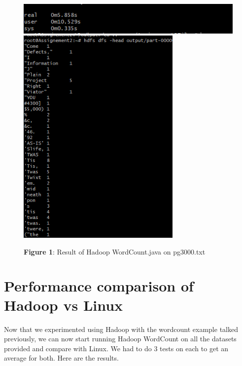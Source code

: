\documentclass[12pt]{article}
\begin{document}
	\begin{figure}[H]
	\centering
	\includegraphics[width=140mm, scale=0.5]{images/hadoop-time.png}
	\includegraphics[width=80mm, scale=0.75]{images/output-pg4300.png}
	\caption*{\textbf{Figure 1}: Result of Hadoop WordCount.java on pg3000.txt}
	\end{figure}

\section{Performance comparison of Hadoop vs Linux}
    \paragraph{} Now that we experimented using Hadoop with the wordcount example talked previously, 
	we can now start running Hadoop WordCount on all the datasets provided and compare with Linux. 
	We had to do 3 tests on each to get an average for both. Here are the results.
\end{document}
